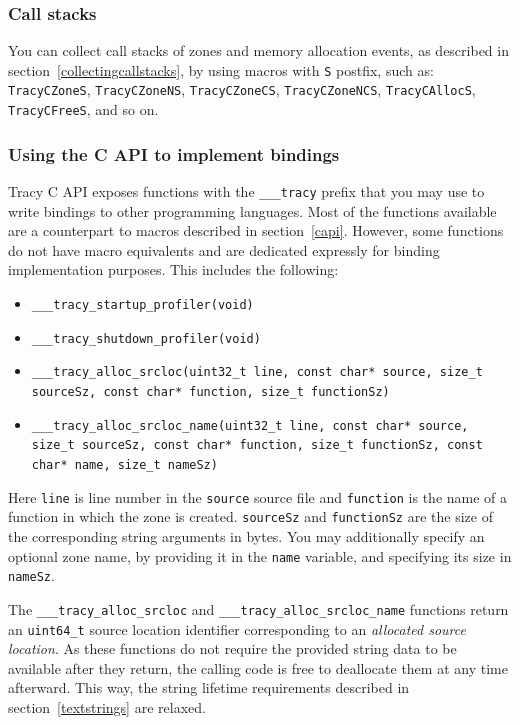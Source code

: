 \documentclass[hidelinks,titlepage,a4paper]{article}
\begin{document}
\subsubsection{Call stacks}

You can collect call stacks of zones and memory allocation events, as described in section~\ref{collectingcallstacks}, by using macros with \texttt{S} postfix, such as: \texttt{TracyCZoneS}, \texttt{TracyCZoneNS}, \texttt{TracyCZoneCS}, \texttt{TracyCZoneNCS}, \texttt{TracyCAllocS}, \texttt{TracyCFreeS}, and so on.

\subsubsection{Using the C API to implement bindings}
\label{capibindings}

Tracy C API exposes functions with the \texttt{\_\_\_tracy} prefix that you may use to write bindings to other programming languages. Most of the functions available are a counterpart to macros described in section~\ref{capi}. However, some functions do not have macro equivalents and are dedicated expressly for binding implementation purposes. This includes the following:

\begin{itemize}
\item \texttt{\_\_\_tracy\_startup\_profiler(void)}
\item \texttt{\_\_\_tracy\_shutdown\_profiler(void)}
\item \texttt{\_\_\_tracy\_alloc\_srcloc(uint32\_t line, const char* source, size\_t sourceSz, const char* function, size\_t functionSz)}
\item \texttt{\_\_\_tracy\_alloc\_srcloc\_name(uint32\_t line, const char* source, size\_t sourceSz, const char* function, size\_t functionSz, const char* name, size\_t nameSz)}
\end{itemize}

Here \texttt{line} is line number in the \texttt{source} source file and \texttt{function} is the
name of a function in which the zone is created. \texttt{sourceSz} and \texttt{functionSz} are the
size of the corresponding string arguments in bytes. You may additionally specify an optional zone
name, by providing it in the \texttt{name} variable, and specifying its size in \texttt{nameSz}.

The \texttt{\_\_\_tracy\_alloc\_srcloc} and \texttt{\_\_\_tracy\_alloc\_srcloc\_name} functions
return an \texttt{uint64\_t} source location identifier corresponding to an \emph{allocated source
location}. As these functions do not require the provided string data to be available after they
return, the calling code is free to deallocate them at any time afterward. This way, the string
lifetime requirements described in section~\ref{textstrings} are relaxed.
\end{document}
